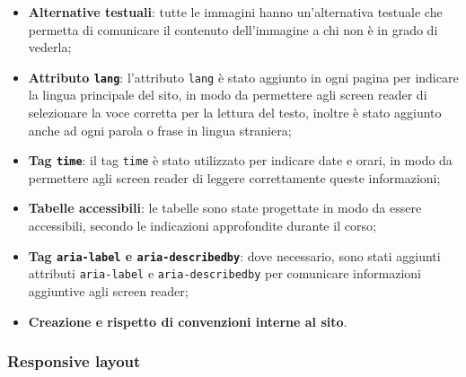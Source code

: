 \begin{itemize}
	\item \textbf{Alternative testuali}: tutte le immagini hanno un'alternativa
	      testuale che permetta di comunicare il contenuto dell'immagine a chi
	      non è in grado di vederla;

	\item \textbf{Attributo \texttt{lang}}: l'attributo \texttt{lang} è stato
	      aggiunto in ogni pagina per indicare la lingua principale del sito,
	      in modo da permettere agli screen reader di selezionare la voce
	      corretta per la lettura del testo, inoltre è stato aggiunto anche
	      ad ogni parola o frase in lingua straniera;

	\item \textbf{Tag \texttt{time}}: il tag \texttt{time} è stato utilizzato
	      per indicare date e orari, in modo da permettere agli screen reader
	      di leggere correttamente queste informazioni;

	\item \textbf{Tabelle accessibili}: le tabelle sono state progettate in modo
	      da essere accessibili, secondo le indicazioni approfondite durante il
	      corso;

	\item \textbf{Tag \texttt{aria-label} e \texttt{aria-describedby}}: dove
	      necessario, sono stati aggiunti attributi \texttt{aria-label} e
	      \texttt{aria-describedby} per comunicare informazioni aggiuntive agli
	      screen reader;

	\item \textbf{Creazione e rispetto di convenzioni interne al sito}.
\end{itemize}

\subsubsection{Responsive layout}

